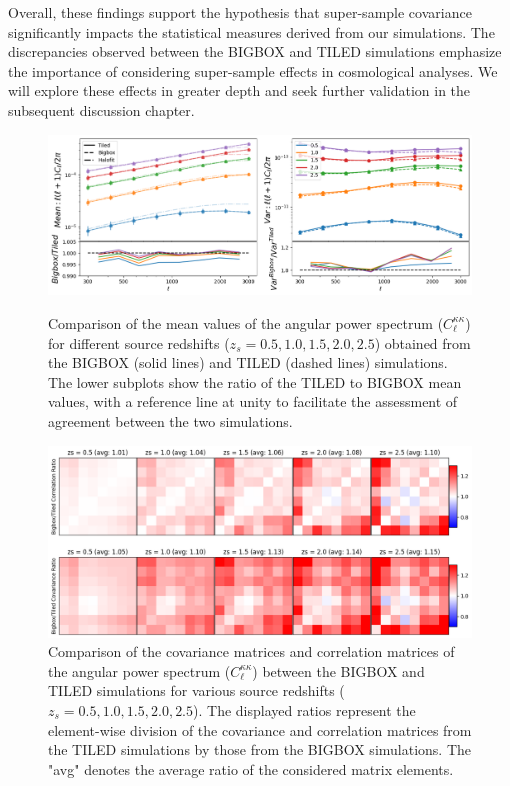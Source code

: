 Overall, these findings support the hypothesis that super-sample covariance significantly impacts the statistical measures derived from our simulations. The discrepancies observed between the BIGBOX and TILED simulations emphasize the importance of considering super-sample effects in cosmological analyses. We will explore these effects in greater depth and seek further validation in the subsequent discussion chapter.

\begin{figure}[p]
    \centering
    \includegraphics[width=\textwidth]{figures/results/cl_main.png}
    \caption{Comparison of the mean values of the angular power spectrum ($C^{\kappa\kappa}_{\ell}$) for different source redshifts ($z_s = 0.5, 1.0, 1.5, 2.0, 2.5$) obtained from the BIGBOX (solid lines) and TILED (dashed lines) simulations. The lower subplots show the ratio of the TILED to BIGBOX mean values, with a reference line at unity to facilitate the assessment of agreement between the two simulations.}
    \label{fig:cl_main}
    \vspace{2cm}
    \includegraphics[width=\textwidth]{figures/results/cl_cov.png}
    \caption{Comparison of the covariance matrices and correlation matrices of the angular power spectrum ($C^{\kappa\kappa}_{\ell}$) between the BIGBOX and TILED simulations for various source redshifts ($z_s = 0.5, 1.0, 1.5, 2.0, 2.5$). The displayed ratios represent the element-wise division of the covariance and correlation matrices from the TILED simulations by those from the BIGBOX simulations. The "avg" denotes the average ratio of the considered matrix elements.}
    \label{fig:cl_cov}
\end{figure}

